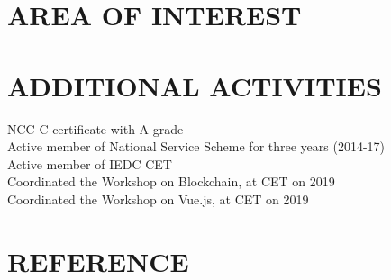 \documentclass[margin]{res}
\begin{document}
\begin{resume}
\section{AREA OF INTEREST}
    \sl {}
\section{ADDITIONAL ACTIVITIES}
    \textbullet{} NCC C-certificate with A grade \\
    \textbullet{} Active member of National Service Scheme for three years (2014-17) \\
    \textbullet{} Active member of IEDC CET \\
    \textbullet{} Coordinated the Workshop on Blockchain, at CET on 2019 \\
    \textbullet{} Coordinated the Workshop on Vue.js, at CET on 2019 

\section{REFERENCE}
    \sl {}
\end{resume}
\end{document}
